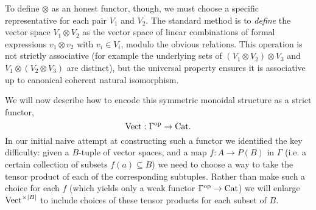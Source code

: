 \documentclass{amsart}
\begin{document}
To define $\otimes$ as an honest functor, though, we must choose a specific representative for each pair $V_1$ and $V_2$. The standard method is to {\em define} the vector space $V_1 \otimes V_2$ as the vector space of linear combinations of formal expressions $v_1 \otimes v_2$ with $v_i \in V_i$, modulo the obvious relations. This operation is not strictly associative (for example the underlying sets of $(V_1 \otimes V_2) \otimes V_3$ and $V_1 \otimes (V_2 \otimes V_3)$ are distinct), but the universal property ensures it is associative up to canonical coherent natural isomorphism.

We will now describe how to encode this symmetric monoidal structure as a strict functor,
\begin{equation*}
	\mathrm{Vect}: \Gamma^\text{op} \to \mathrm{Cat}.
\end{equation*}  
In our initial naive attempt at constructing such a functor we identified the key difficulty: given a $B$-tuple of vector spaces, and a map $f: A \to P(B)$ in $\Gamma$ (i.e. a certain collection of subsets $f(a) \subseteq B$) we need to choose a way to take the tensor product of each of the corresponding subtuples. Rather than make such a choice for each $f$ (which yields only a weak functor $\Gamma^\text{op} \to \mathrm{Cat}$) we will enlarge $\mathrm{Vect}^{\times |B|}$ to include choices of these tensor products for each subset of $B$. 
\end{document}
